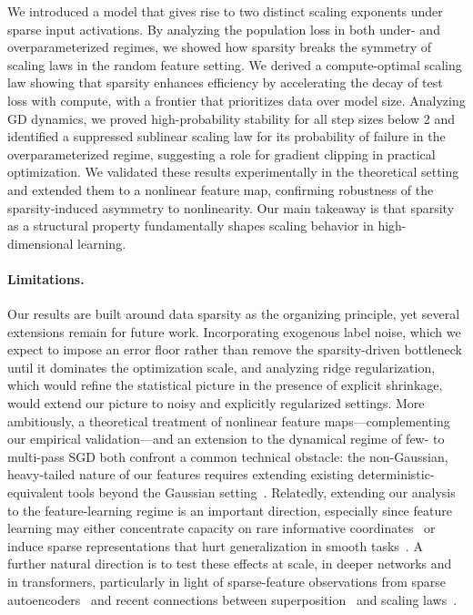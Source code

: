 \documentclass[11pt]{article}
\theoremstyle{plain}
\theoremstyle{definition}
\theoremstyle{remark}
\newcommand{\JSCheck}[1]{#1}
\begin{document}
\JSCheck{We introduced a model that gives rise to two distinct scaling exponents under sparse input activations. By analyzing the population loss in both under- and overparameterized regimes, we showed how sparsity breaks the symmetry of scaling laws in the random feature setting. We derived a compute-optimal scaling law showing that sparsity enhances efficiency by accelerating the decay of test loss with compute, with a frontier that prioritizes data over model size. Analyzing GD dynamics, we proved high-probability stability for all step sizes below 2 and identified a suppressed sublinear scaling law for its probability of failure in the overparameterized regime, suggesting a role for gradient clipping in practical optimization. We validated these results experimentally in the theoretical setting and extended them to a nonlinear feature map, confirming robustness of the sparsity-induced asymmetry to nonlinearity. Our main takeaway is that sparsity as a structural property fundamentally shapes scaling behavior in high-dimensional learning.}

\vspace{-3mm}
\paragraph{Limitations.} \JSCheck{Our results are built around data sparsity as the organizing principle, yet several extensions remain for future work. Incorporating exogenous label noise, which we expect to impose an error floor rather than remove the sparsity-driven bottleneck until it dominates the optimization scale, and analyzing ridge regularization, which would refine the statistical picture in the presence of explicit shrinkage, would extend our picture to noisy and explicitly regularized settings. More ambitiously, a theoretical treatment of nonlinear feature maps---complementing our empirical validation---and an extension to the dynamical regime of few- to multi-pass SGD both confront a common technical obstacle: the non-Gaussian, heavy-tailed nature of our features requires extending existing deterministic-equivalent tools beyond the Gaussian setting~\citep{mei2022rf,hu2022universality}.  Relatedly, extending our analysis to the feature-learning regime is an important direction, especially since feature learning may either concentrate capacity on rare informative coordinates~\citep{bordelon2025featurelearning} or induce sparse representations that hurt generalization in smooth tasks~\citep{petrini2022learning}. A further natural direction is to test these effects at scale, in deeper networks and in transformers, particularly in light of sparse-feature observations from sparse autoencoders~\citep{bricken2023monosemanticity,templeton2024scaling} and recent connections between superposition~\citep{elhage2022toy} and scaling laws~\citep{liu2025superposition}.}
\end{document}

